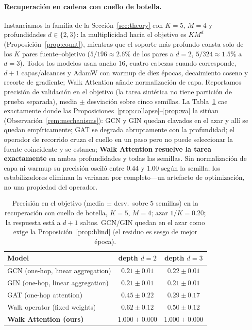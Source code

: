 \documentclass[runningheads]{llncs}
\begin{document}
\paragraph{Recuperación en cadena con cuello de botella.}
Instanciamos la familia de la Sección~\ref{sec:theory} con $K{=}5$, $M{=}4$ y
profundidades $d\in\{2,3\}$: la multiplicidad hacia el objetivo es $KM^d$
(Proposición~\ref{prop:count}), mientras que el soporte más profundo consta
solo de los $K$ pares fuente--objetivo ($5/196\approx2.6\%$ de los pares a
$d{=}2$, $5/324\approx1.5\%$ a $d{=}3$). Todos los modelos usan ancho $16$,
cuatro cabezas cuando corresponde, $d{+}1$ capas/alcances y AdamW con warmup de
diez épocas, decaimiento coseno y recorte de gradiente; Walk Attention añade
normalización de capa. Reportamos precisión de validación en el objetivo (la
tarea sintética no tiene partición de prueba separada), media $\pm$ desviación
sobre cinco semillas. La Tabla~\ref{tab:main} cae exactamente donde las
Proposiciones~\ref{prop:collapse}--\ref{prop:wa} la sitúan
(Observación~\ref{rem:mechanisms}): GCN y GIN quedan clavados en el azar y allí
se quedan empíricamente; GAT se degrada abruptamente con la profundidad; el
operador de recorrido cruza el cuello en un paso pero no puede seleccionar la
fuente coincidente y se estanca; \textbf{Walk Attention resuelve la tarea
exactamente} en ambas profundidades y todas las semillas. Sin normalización de
capa ni warmup su precisión osciló entre $0.44$ y $1.00$ según la semilla; los
estabilizadores eliminan la varianza por completo---un artefacto de
optimización, no una propiedad del operador.

\begin{table}[t]
\centering
\caption{Precisión en el objetivo (media $\pm$ desv.\ sobre 5 semillas) en la
recuperación con cuello de botella, $K{=}5$, $M{=}4$; azar $1/K=0.20$; la
respuesta está a $d{+}1$ saltos. GCN/GIN quedan en el azar como exige la
Proposición~\ref{prop:blind} (el residuo es sesgo de mejor época).}
\label{tab:main}
\begin{tabular}{lcc}
\toprule
\textbf{Model} & \textbf{depth $d=2$} & \textbf{depth $d=3$} \\
\midrule
GCN (one-hop, linear aggregation)  & $0.21\pm0.01$ & $0.22\pm0.01$ \\
GIN (one-hop, linear aggregation)  & $0.21\pm0.01$ & $0.21\pm0.01$ \\
GAT (one-hop attention)            & $0.45\pm0.22$ & $0.29\pm0.17$ \\
Walk operator (fixed weights)      & $0.62\pm0.12$ & $0.50\pm0.12$ \\
\textbf{Walk Attention (ours)}     & $\mathbf{1.000\pm0.000}$ & $\mathbf{1.000\pm0.000}$ \\
\bottomrule
\end{tabular}
\end{table}
\end{document}
